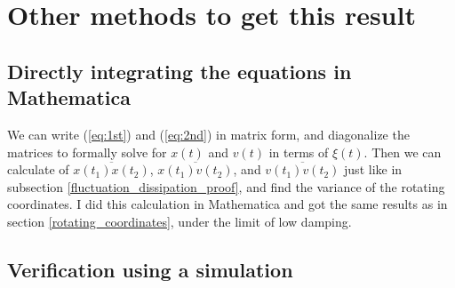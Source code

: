 \documentclass[12pt, twoside]{article}
\begin{document}
\section{Other methods to get this result}
\subsection{Directly integrating the equations in Mathematica}
We can write (\ref{eq:1st}) and (\ref{eq:2nd}) in matrix form, and diagonalize the matrices to formally solve for $x(t)$ and $v(t)$ in terms of $\xi(t)$. Then we can calculate of $\overline{x(t_1)x(t_2)}$, $\overline{x(t_1)v(t_2)}$, and  $\overline{v(t_1)v(t_2)}$ just like in subsection \ref{fluctuation_dissipation_proof}, and find the variance of the rotating coordinates. I did this calculation in Mathematica and got the same results as in section \ref{rotating_coordinates}, under the limit of low damping.

\subsection{Verification using a simulation}
\end{document}

